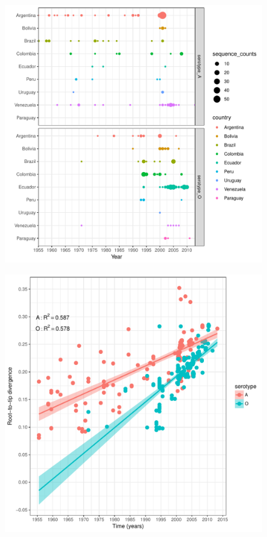\documentclass[a4paper,10pt]{article}
\begin{document}
\newpage
\begin{center}
\begin{figure}[H]
\begin{center}
\includegraphics[scale=.80]{FIGURES/PLOTS/sampling_bubble_plot.pdf}
\end{center}
\caption{}
\label{sfig:sampling}
\end{figure}
\end{center}
\newpage
\begin{center}
\begin{figure}[H]
\begin{center}
\includegraphics[scale=.75]{FIGURES/PLOTS/rdvs.pdf}
\end{center}
\caption{}
\label{sfig:root-to-tip}
\end{figure}
\end{center}
\end{document}
